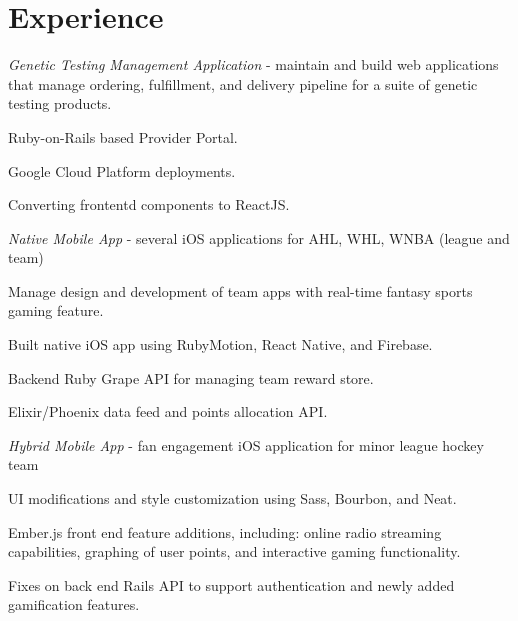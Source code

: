 \documentclass[]{deedy-resume-openfont}
\begin{document}
\begin{minipage}[t]{0.66\textwidth} 


\section{Experience}

\textit{Genetic Testing Management Application} - maintain and build web applications that manage ordering, fulfillment, and delivery pipeline for a suite of genetic testing products.
\vspace{\topsep} %
\begin{tightemize}
\item Ruby-on-Rails based Provider Portal.
\item Google Cloud Platform deployments.
\item Converting frontentd components to ReactJS.
\end{tightemize}
\sectionsep

\textit{Native Mobile App} - several iOS applications for AHL, WHL, WNBA (league and team)
\vspace{\topsep} %
\begin{tightemize}
\item Manage design and development of team apps with real-time fantasy sports gaming feature.
\item Built native iOS app using RubyMotion, React Native, and Firebase.
\item Backend Ruby Grape API for managing team reward store.
\item Elixir/Phoenix data feed and points allocation API.
\end{tightemize}
\textit{Hybrid Mobile App} - fan engagement iOS application for minor league hockey team
\begin{tightemize}
\item UI modifications and style customization using Sass, Bourbon, and Neat.
\item Ember.js front end feature additions, including: online radio streaming capabilities, graphing of user points, and interactive gaming functionality.
\item Fixes on back end Rails API to support authentication and newly added gamification features.
\end{tightemize}
\sectionsep


\end{minipage}
\end{document}
